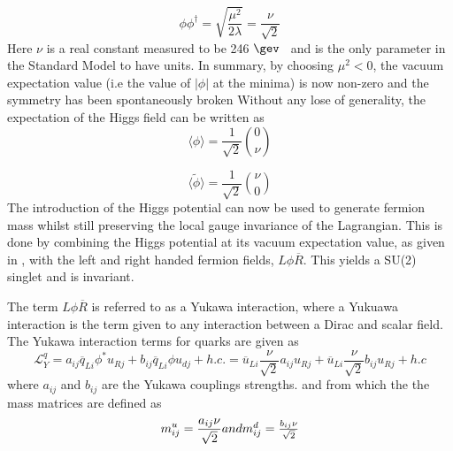 \begin{equation}
  \phi\phi^{\dagger} = \sqrt{\frac{\mu^{2}}{2\lambda}} = \frac{\nu}{\sqrt{2}}
\end{equation}
Here $\nu$ is a real constant measured to be 246 $\gev$~\cite{vev} and is the only parameter in the Standard Model to have units. In summary, by choosing $\mu^{2}<0$, the vacuum expectation value (i.e the value of $|\phi|$ at the minima) is now non-zero and the symmetry has been spontaneously broken %
 Without any lose of generality, the expectation of the Higgs field can be written as
 \begin{equation}
   \label{eq:expt}
  \langle{\phi}\rangle = \frac{1}{\sqrt{2}}\binom{0}{\nu}  %
\end{equation}

\begin{equation}
  \langle\tilde{\phi}\rangle = \frac{1}{\sqrt{2}}\binom{\nu}{0}
\end{equation}
The introduction of the Higgs potential can now be used to generate fermion mass whilst still preserving the local gauge invariance of the Lagrangian. This is done by combining the Higgs potential at its vacuum expectation value, as given in \label{eq:expt}, with the left and right handed fermion fields, $L\phi\overline{R}$. This yields a SU(2) singlet and is invariant. 

The term $L\phi\overline{R}$ is referred to as a Yukawa interaction, where a Yukuawa interaction is the term given to any interaction between a Dirac and scalar field.  The Yukawa interaction terms for quarks are given as
\begin{equation}
  \mathcal{L}^{q}_{Y} = a_{ij}\overline{q}_{Li}\phi^{*}u_{Rj} + b_{ij}\overline{q}_{Li}\phi u_{dj} + h.c.%
  =%
   \overline{u}_{Li}\frac{\nu}{\sqrt{2}}a_{ij}u_{Rj} + \overline{u}_{Li}\frac{\nu}{\sqrt{2}} b_{ij}u_{Rj} + h.c
\label{eq:yukawa}
\end{equation}
where $a_{ij}$ and $b_{ij}$ are the Yukawa couplings strengths.
and from which the the mass matrices are defined as
\begin{equation}
  m^{u}_{ij} = \frac{a_{ij}\nu}{\sqrt{2}} $$and$$ \\
  m^{d}_{ij} = \frac{b_{ij}\nu}{\sqrt{2}} 
\end{equation}

